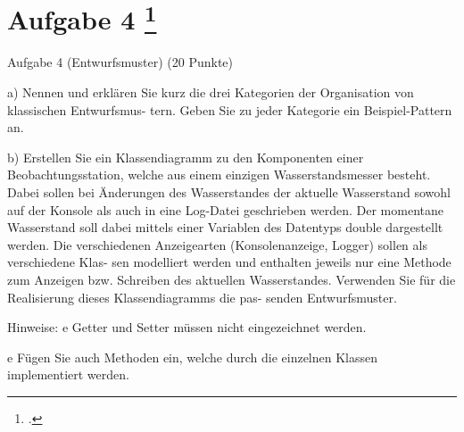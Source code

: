 \documentclass{lehramt-informatik-aufgabe}
\begin{document}
\liAufgabenTitel{}
\section{Aufgabe 4
\footcite{66116:2021:03}}

Aufgabe 4 (Entwurfsmuster) (20 Punkte)

a) Nennen und erklären Sie kurz die drei Kategorien der Organisation von klassischen Entwurfsmus-
tern. Geben Sie zu jeder Kategorie ein Beispiel-Pattern an.

b) Erstellen Sie ein Klassendiagramm zu den Komponenten einer Beobachtungsstation, welche aus
einem einzigen Wasserstandsmesser besteht. Dabei sollen bei Änderungen des Wasserstandes der
aktuelle Wasserstand sowohl auf der Konsole als auch in eine Log-Datei geschrieben werden. Der
momentane Wasserstand soll dabei mittels einer Variablen des Datentyps double dargestellt
werden. Die verschiedenen Anzeigearten (Konsolenanzeige, Logger) sollen als verschiedene Klas-
sen modelliert werden und enthalten jeweils nur eine Methode zum Anzeigen bzw. Schreiben des
aktuellen Wasserstandes. Verwenden Sie für die Realisierung dieses Klassendiagramms die pas-
senden Entwurfsmuster.

Hinweise:
e Getter und Setter müssen nicht eingezeichnet werden.

e Fügen Sie auch Methoden ein, welche durch die einzelnen Klassen implementiert werden.
\end{document}
